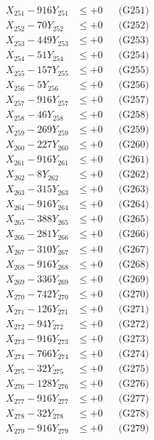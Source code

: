 \documentclass[a4paper,10pt]{article}
\begin{document}
{\begin{align}
\allowbreak
X_{251} - 916Y_{251} &\leq +0 && \text{(G251)} \\
X_{252} - 70Y_{252} &\leq +0 && \text{(G252)} \\
X_{253} - 449Y_{253} &\leq +0 && \text{(G253)} \\
X_{254} - 51Y_{254} &\leq +0 && \text{(G254)} \\
X_{255} - 157Y_{255} &\leq +0 && \text{(G255)} \\
X_{256} - 5Y_{256} &\leq +0 && \text{(G256)} \\
X_{257} - 916Y_{257} &\leq +0 && \text{(G257)} \\
X_{258} - 46Y_{258} &\leq +0 && \text{(G258)} \\
X_{259} - 269Y_{259} &\leq +0 && \text{(G259)} \\
X_{260} - 227Y_{260} &\leq +0 && \text{(G260)} \\
\allowbreak
X_{261} - 916Y_{261} &\leq +0 && \text{(G261)} \\
X_{262} - 8Y_{262} &\leq +0 && \text{(G262)} \\
X_{263} - 315Y_{263} &\leq +0 && \text{(G263)} \\
X_{264} - 916Y_{264} &\leq +0 && \text{(G264)} \\
X_{265} - 388Y_{265} &\leq +0 && \text{(G265)} \\
X_{266} - 281Y_{266} &\leq +0 && \text{(G266)} \\
X_{267} - 310Y_{267} &\leq +0 && \text{(G267)} \\
X_{268} - 916Y_{268} &\leq +0 && \text{(G268)} \\
X_{269} - 336Y_{269} &\leq +0 && \text{(G269)} \\
X_{270} - 742Y_{270} &\leq +0 && \text{(G270)} \\
\allowbreak
X_{271} - 126Y_{271} &\leq +0 && \text{(G271)} \\
X_{272} - 94Y_{272} &\leq +0 && \text{(G272)} \\
X_{273} - 916Y_{273} &\leq +0 && \text{(G273)} \\
X_{274} - 766Y_{274} &\leq +0 && \text{(G274)} \\
X_{275} - 32Y_{275} &\leq +0 && \text{(G275)} \\
X_{276} - 128Y_{276} &\leq +0 && \text{(G276)} \\
X_{277} - 916Y_{277} &\leq +0 && \text{(G277)} \\
X_{278} - 32Y_{278} &\leq +0 && \text{(G278)} \\
X_{279} - 916Y_{279} &\leq +0 && \text{(G279)} \\

\end{align}}
\end{document}
